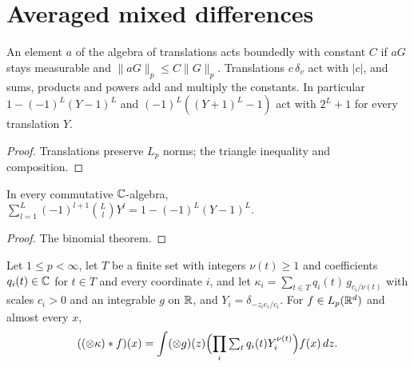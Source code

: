\section{Averaged mixed differences}

\begin{lemma}
\label{lem:acts-bounded}
\leanok
{}
An element $a$ of the algebra of translations acts boundedly with constant $C$ if $a G$ stays
measurable and $\|a G\|_p \leq C \|G\|_p$. Translations $c \, \delta_v$ act with $|c|$, and sums,
products and powers add and multiply the constants. In particular $1 - (-1)^L (Y - 1)^L$ and
$(-1)^L ((Y + 1)^L - 1)$ act with $2^L + 1$ for every translation $Y$.
\end{lemma}

\begin{proof}
\leanok
Translations preserve $L_p$ norms; the triangle inequality and composition.
\end{proof}

\begin{lemma}
\label{lem:moment-polynomial}
\leanok
{}
In every commutative $\mathbb{C}$-algebra,
$\sum_{l=1}^L (-1)^{l+1} \binom{L}{l} Y^l = 1 - (-1)^L (Y - 1)^L$.
\end{lemma}

\begin{proof}
\leanok
The binomial theorem.
\end{proof}

\begin{theorem}
\label{thm:tensor-averaged-differences}
\leanok
{}
Let $1 \leq p < \infty$, let $T$ be a finite set with integers $\nu(t) \geq 1$ and coefficients
$q_i(t) \in \mathbb{C}$ for $t \in T$ and every coordinate $i$, and let
$\kappa_i = \sum_{t \in T} q_i(t) \, g_{c_i/\nu(t)}$ with scales $c_i > 0$ and an integrable $g$
on $\mathbb{R}$, and $Y_i = \delta_{-z_i e_i / c_i}$. For $f \in L_p(\mathbb{R}^d)$ and almost every $x$,
\[
  ((\otimes\kappa) * f)(x) = \int (\otimes g)(z)
    \Bigl(\prod_i \textstyle\sum_t q_i(t) Y_i^{\nu(t)}\Bigr) f(x) \, dz .
\]
\end{theorem}

